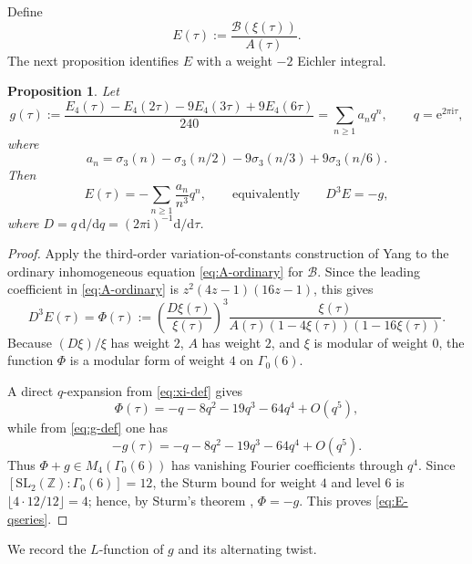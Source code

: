 \documentclass[11pt]{amsart}
\newtheorem{proposition}[theorem]{Proposition}
\theoremstyle{definition}
\theoremstyle{remark}
\newcommand{\Z}{\mathbb{Z}}
\newcommand{\dd}{\mathrm{d}}
\newcommand{\e}{\mathrm{e}}
\newcommand{\ii}{\mathrm{i}}
\newcommand{\Efour}{E_4}
\newcommand{\sigthree}{\sigma_3}
\newcommand{\Dop}{D}
\begin{document}
Define
\begin{equation}\label{eq:E-def}
E(\tau):=\frac{\mathcal B(\xi(\tau))}{A(\tau)}.
\end{equation}
The next proposition identifies $E$ with a weight $-2$ Eichler integral.

\begin{proposition}\label{prop:Eichler}
Let
\begin{equation}\label{eq:g-def}
g(\tau):=\frac{\Efour(\tau)-\Efour(2\tau)-9\Efour(3\tau)+9\Efour(6\tau)}{240}
=\sum_{n\ge 1}a_nq^n,
\qquad q=\e^{2\pi\ii\tau},
\end{equation}
where
\begin{equation}\label{eq:a-n-def}
a_n=\sigthree(n)-\sigthree(n/2)-9\sigthree(n/3)+9\sigthree(n/6).
\end{equation}
Then
\begin{equation}\label{eq:E-qseries}
E(\tau)=-\sum_{n\ge 1}\frac{a_n}{n^3}q^n,
\qquad\text{equivalently}\qquad
\Dop^3E=-g,
\end{equation}
where $\Dop=q\,\dd/\dd q=(2\pi\ii)^{-1}\dd/\dd\tau$.
\end{proposition}

\begin{proof}
Apply the third-order variation-of-constants construction of Yang \cite[Lemmas~1--2]{Yang2008} to the ordinary inhomogeneous equation \eqref{eq:A-ordinary} for $\mathcal B$. Since the leading coefficient in \eqref{eq:A-ordinary} is $z^2(4z-1)(16z-1)$, this gives
\begin{equation}\label{eq:phi-def}
\Dop^3E(\tau)=\Phi(\tau):=\left(\frac{\Dop\xi(\tau)}{\xi(\tau)}\right)^3\frac{\xi(\tau)}{A(\tau)(1-4\xi(\tau))(1-16\xi(\tau))}.
\end{equation}
Because $(\Dop\xi)/\xi$ has weight $2$, $A$ has weight $2$, and $\xi$ is modular of weight $0$, the function $\Phi$ is a modular form of weight $4$ on $\Gamma_0(6)$.

A direct $q$-expansion from \eqref{eq:xi-def} gives
\[
\Phi(\tau)=-q-8q^2-19q^3-64q^4+O(q^5),
\]
while from \eqref{eq:g-def} one has
\[
-g(\tau)=-q-8q^2-19q^3-64q^4+O(q^5).
\]
Thus $\Phi+g\in M_4(\Gamma_0(6))$ has vanishing Fourier coefficients through $q^4$. Since $[\mathrm{SL}_2(\Z):\Gamma_0(6)]=12$, the Sturm bound for weight $4$ and level $6$ is $\lfloor 4\cdot 12/12\rfloor=4$; hence, by Sturm's theorem \cite[Theorem~3.13]{DiamondShurman}, $\Phi=-g$. This proves \eqref{eq:E-qseries}.
\end{proof}

We record the $L$-function of $g$ and its alternating twist.
\end{document}
